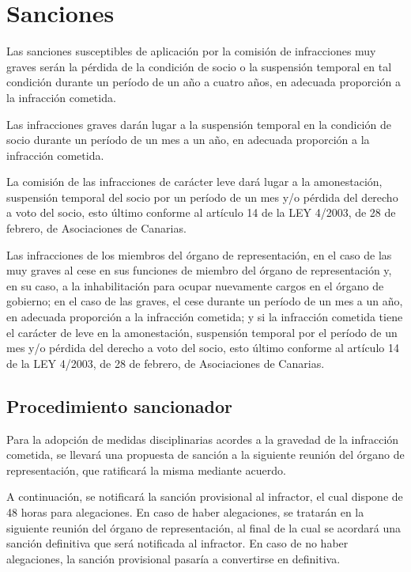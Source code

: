 \documentclass[a4paper, 12pt, oneside]{book}
\begin{document}
\section{Sanciones}

Las sanciones susceptibles de aplicación por la comisión de infracciones muy graves serán la pérdida de la condición de socio o la suspensión temporal en tal condición durante un período de un año a cuatro años, en adecuada proporción a la infracción cometida.

Las infracciones graves darán lugar a la suspensión temporal en la condición de socio durante un período de un mes a un año, en adecuada proporción a la infracción cometida.

La comisión de las infracciones de carácter leve dará lugar a la amonestación, suspensión temporal del socio por un período de un mes y/o pérdida del derecho a voto del socio, esto último conforme al artículo 14 de la LEY 4/2003, de 28 de febrero, de Asociaciones de Canarias.

Las infracciones de los miembros del órgano de representación, en el caso de las muy graves al cese en sus funciones de miembro del órgano de representación y, en su caso, a la inhabilitación para ocupar nuevamente cargos en el órgano de gobierno; en el caso de las graves, el cese durante un período de un mes a un año, en adecuada proporción a la infracción cometida; y si la infracción cometida tiene el carácter de leve en la amonestación, suspensión temporal por el período de un mes y/o pérdida del derecho a voto del socio, esto último conforme al artículo 14 de la LEY 4/2003, de 28 de febrero, de Asociaciones de Canarias.

\subsection{Procedimiento sancionador}

Para la adopción de medidas disciplinarias acordes a la gravedad de la infracción cometida, se llevará una propuesta de sanción a la siguiente reunión del órgano de representación, que ratificará la misma mediante acuerdo.

A continuación, se notificará la sanción provisional al infractor, el cual dispone de 48 horas para alegaciones. En caso de haber alegaciones, se tratarán en la siguiente reunión del órgano de representación, al final de la cual se acordará una sanción definitiva que será notificada al infractor. En caso de no haber alegaciones, la sanción provisional pasaría a convertirse en definitiva.
\end{document}
